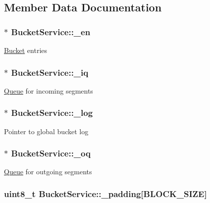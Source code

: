\subsection{\-Member \-Data \-Documentation}
\hypertarget{structBucketService_af1cb4c78ed471459bf6b64e75d4bf96e}{
\subsubsection[{\-\_\-en}]{$\ast$ {\bf \-Bucket\-Service\-::\-\_\-en}}}\label{structBucketService_af1cb4c78ed471459bf6b64e75d4bf96e}
\hyperlink{structBucket}{\-Bucket} entries \hypertarget{structBucketService_a4428a33d4085d38626c41a657ddd778c}{
\subsubsection[{\-\_\-iq}]{$\ast$ {\bf \-Bucket\-Service\-::\-\_\-iq}}}\label{structBucketService_a4428a33d4085d38626c41a657ddd778c}
\hyperlink{structQueue}{\-Queue} for incoming segments \hypertarget{structBucketService_a64edf0ca968a980121849365b3a7dea3}{
\subsubsection[{\-\_\-log}]{$\ast$ {\bf \-Bucket\-Service\-::\-\_\-log}}}\label{structBucketService_a64edf0ca968a980121849365b3a7dea3}
\-Pointer to global bucket log \hypertarget{structBucketService_a0b433c0713b4d77128a43603f0c45805}{
\subsubsection[{\-\_\-oq}]{$\ast$ {\bf \-Bucket\-Service\-::\-\_\-oq}}}\label{structBucketService_a0b433c0713b4d77128a43603f0c45805}
\hyperlink{structQueue}{\-Queue} for outgoing segments \hypertarget{structBucketService_a4d6a26405ae6ce5c83f9b43a550b20c8}{
\subsubsection[{\-\_\-padding}]{\setlength{\rightskip}{0pt plus 5cm}uint8\-\_\-t {\bf \-Bucket\-Service\-::\-\_\-padding}\mbox{[}{\bf \-B\-L\-O\-C\-K\-\_\-\-S\-I\-Z\-E}\mbox{]}}}\label{structBucketService_a4d6a26405ae6ce5c83f9b43a550b20c8}

